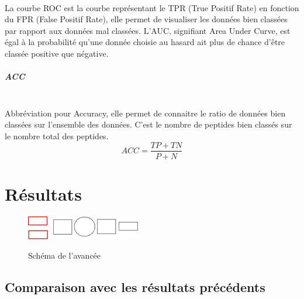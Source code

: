 \documentclass[a4paper,10pt]{report}
\begin{document}
	     ~\\La courbe ROC est la courbe représentant le TPR (True Positif Rate) en fonction du FPR (False Positif Rate), elle permet de visualiser les données bien classées par rapport aux données mal classées.
	     L'AUC, signifiant Area Under Curve, est égal à la probabilité qu'une donnée choisie au hasard ait plus de chance d'être classée positive que négative.
	     
	     \paragraph{ACC}
	     
	     ~\\Abbréviation pour Accuracy, elle permet de connaitre le ratio de données bien classées sur l'ensemble des données.
	     C'est le nombre de peptides bien classés sur le nombre total des peptides.
	     \[
	      ACC = \frac{ TP + TN }{ P + N }
	     \]
	     
	     
   \chapter{Résultats}
      
      \begin{figure}[!h]
	    \begin{center}
	      \includegraphics[width=5cm]{image/step1.jpeg} \\
	      \caption{Schéma de l'avancée}
	    \end{center}
	 \end{figure}
      
       \section{Comparaison avec les résultats précédents}
      
\end{document}
